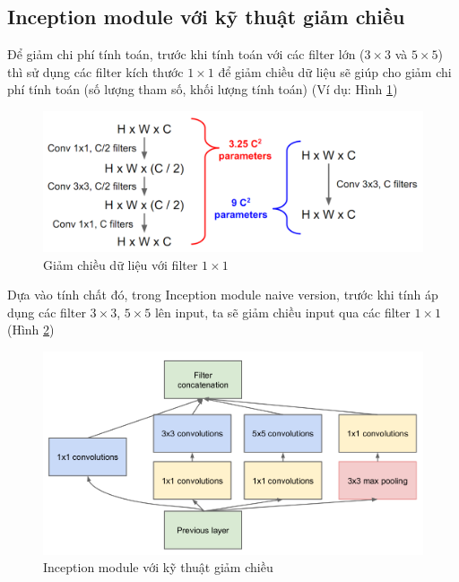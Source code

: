\documentclass[a4paper,12pt]{report}
\begin{document}
\subsection{Inception module với kỹ thuật giảm chiều}
Để giảm chi phí tính toán, trước khi tính toán với các filter lớn ($3\times 3$ và $5 \times 5$) thì sử dụng các filter kích thước $1 \times 1$ để giảm chiều dữ liệu sẽ giúp cho giảm chi phí tính toán (số lượng tham số, khối lượng tính toán) (Ví dụ: Hình \ref{fig_reduce1x1})
\begin{figure}[H]
\centering
\includegraphics[scale=0.4]{reduce_1x1.png}
\caption{Giảm chiều dữ liệu với filter $1 \times 1$}
\label{fig_reduce1x1}
\end{figure}
\par Dựa vào tính chất đó, trong Inception module naive version, trước khi tính áp dụng các filter $3 \times 3$, $5 \times 5$ lên input, ta sẽ giảm chiều input qua các filter $1 \times 1$ (Hình \ref{fig_inception_reduce})
\begin{figure}[H]
\centering 
\includegraphics[scale=0.45]{inception_reduce.png}
\caption{Inception module với kỹ thuật giảm chiều}
\label{fig_inception_reduce}
\end{figure}
\end{document}
